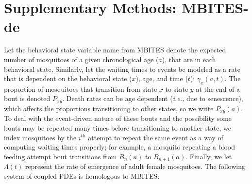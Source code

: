 \documentclass{article}
\begin{document}

\newcommand{\eg}{{\em e.g., }}
\newcommand{\ie}{{\em i.e., }}


\section{Supplementary Methods: MBITES-de}

Let the behavioral state variable name from MBITES denote the expected number of mosquitoes of a given chronological age ($a$), that are in each behavioral state. Similarly, let the waiting times to events be modeled as a rate that is dependent on the behavioral state ($x$), age, and time ($t$): $\gamma_x(a,t)$. The proportion of mosquitoes that transition from state $x$ to state $y$ at the end of a bout is denoted $P_{xy}$. Death rates can be age dependent (\ie due to senescence), which affects the proportions transitioning to other states, so we write $P_{xy}(a)$. To deal with the event-driven nature of these bouts and the possibility some bouts may be repeated many times before transitioning to another state, we index mosquitoes by the $i^{th}$ attempt to repeat the same event as a way of computing waiting times properly; for example, a mosquito repeating a blood feeding attempt bout transitions from $B_n(a)$ to $B_{n+1}(a)$. Finally, we let $\Lambda(t)$ represent the rate of emergence of adult female mosquitoes. The following system of coupled PDEs is homologous to MBITES: 
\end{document}
